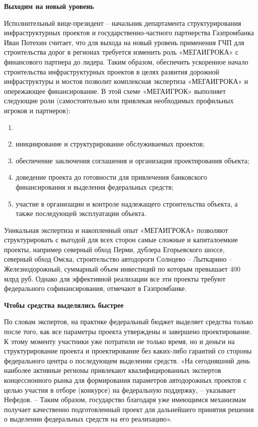 \begin{fancyquotes}
    \textbf{Выходим на новый уровень}

    Исполнительный вице-президент – начальник департамента структурирования инфраструктурных проектов и государственно-частного партнерства Газпромбанка Иван Потехин считает, что для выхода на новый уровень применения ГЧП для строительства дорог в регионах требуется изменить роль «МЕГАИГРОКА» с финансового партнера до лидера. Таким образом, обеспечить ускоренное начало строительства инфраструктурных проектов в целях развития дорожной инфраструктуры и мостов позволит комплексная экспертиза «МЕГАИГРОКА» и опережающее финансирование.
    В этой схеме «МЕГАИГРОК» выполняет следующие роли (самостоятельно или привлекая необходимых профильных игроков и партнеров):
    \begin{enumerate}
        \item
        \item инициирование и структурирование обслуживаемых проектов;
        \item обеспечение заключения соглашения и организация проектирования объекта;
        \item доведение проекта до готовности для привлечения банковского финансирования и выделения федеральных средств;
        \item участие в организации и контроле надлежащего строительства объекта, а также последующей эксплуатации объекта.
    \end{enumerate}
\end{fancyquotes}

Уникальная экспертиза и накопленный опыт «МЕГАИГРОКА» позволяют структурировать с выгодой для всех сторон самые сложные и капиталоемкие проекты, например северный обход Перми, дублера Егорьевского шоссе, северный обход Омска, строительство автодороги Солнцево – Лыткарино – Железнодорожный, суммарный объем инвестиций по которым превышает 400 млрд руб. Однако для эффективной реализации все эти проекты требуют федерального софинансирования, отмечают в Газпромбанке.

\textbf{Чтобы средства выделялись быстрее}

По словам экспертов, на практике федеральный бюджет выделяет средства только после того, как все параметры проекта утверждены и завершено проектирование. К этому моменту участники уже потратили не только время, но и деньги на структурирование проекта и проектирование без каких-либо гарантий со стороны федерального центра о последующем выделении средств. «На сегодняшний день наиболее активные регионы привлекают квалифицированных экспертов концессионного рынка для формирования параметров автодорожных проектов с целью участия в отборе (конкурсе) на федеральную поддержку, – указывает Нефедов. – Таким образом, государство благодаря уже имеющимся механизмам получает качественно подготовленный проект для дальнейшего принятия решения о выделении федеральных средств на его реализацию».

